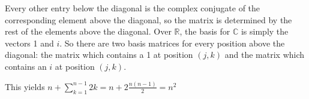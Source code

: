 Every other entry below the diagonal is the complex conjugate of the corresponding element above the diagonal, so the matrix is determined by the rest of the elements above the diagonal. Over $\mathbb{R}$, the basis for $\mathbb{C}$ is simply the vectors 1 and $i$. So there are two basis matrices for every position above the diagonal: the matrix which contains a 1 at position $(j, k)$ and the matrix which contains an $i$ at position $(j, k)$.

This yields $n+\sum_{k=1}^{n-1} 2 k=n+2 \frac{n(n-1)}{2}=n^2$